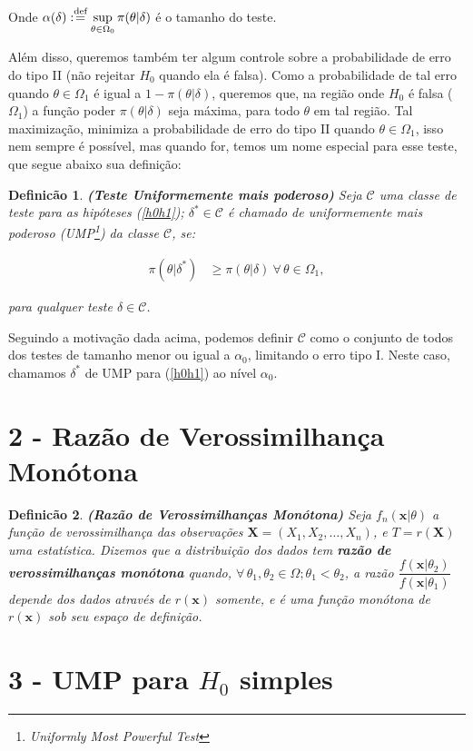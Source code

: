 \documentclass[a4paper,10pt, notitlepage]{report}
\newtheorem{defi}{Definicão}
\newcommand{\rs}{X_1, X_2, \ldots, X_n} %
\newcommand{\bX}{\boldsymbol{X}} %
\newcommand{\bx}{\boldsymbol{x}} %
\newcommand{\defn}{\stackrel{\textrm{\scriptsize def}}{=}}
\newcommand{\mysection}[2]{\setcounter{section}{#1}\addtocounter{section}{-1}\section*{#1 - #2}}
\begin{document}
	Onde $\displaystyle\alpha(\delta):\defn\sup_{\theta\in\Omega_0}\pi(\theta|\delta)$ é o tamanho do teste.
	
	
	
	Além disso, queremos também ter algum controle sobre a probabilidade de erro do tipo II (não rejeitar $H_0$ quando ela é falsa). Como a probabilidade de tal erro quando $\theta \in \Omega_1$ é igual a $1-\pi(\theta|\delta)$, queremos que, na região onde $H_0$ é falsa ($\Omega_1$) a função poder $\pi(\theta|\delta)$ seja máxima, para todo $\theta$ em tal região. Tal maximização, minimiza a probabilidade de erro do tipo II quando $\theta\in\Omega_1$, isso nem sempre é possível, mas quando for, temos um nome especial para esse teste, que segue abaixo sua definição:
	
	\begin{defi}
		\textbf{(Teste Uniformemente mais poderoso)}
		\label{ump} 
		Seja $\mathcal{C}$ uma classe de teste para as hipóteses (\ref{h0h1}); $\delta^*\in\mathcal{C}$ é chamado de uniformemente mais poderoso (UMP\footnote{Uniformly Most Powerful Test}) da classe $\mathcal{C}$, se:
		
		\begin{align*}\pi(\theta|\delta^*)&\geq\pi(\theta|\delta) ~\forall \,\theta \in \Omega_1,
		\end{align*}
		
		para qualquer teste $\delta\in\mathcal{C}$.
		
	\end{defi} 
	Seguindo a motivação dada acima, podemos definir $\mathcal{C}$ como o conjunto de todos dos testes de tamanho menor ou igual a $\alpha_0$, limitando o erro tipo I. Neste caso, chamamos $\delta^*$ de UMP para (\ref{h0h1}) ao nível $\alpha_0$.
	
	\mysection{2}{Razão de Verossimilhança Monótona}
	
	\begin{defi}
		\textbf{(Razão de Verossimilhanças Monótona)} Seja $f_n(\bx|\theta)$ a função de verossimilhança das observações $\bX = (\rs)$, e $T=r(\bX)$ uma estatística. Dizemos que a distribuição dos dados tem \textbf{razão de verossimilhanças monótona} quando, $\forall\,\theta_1,\theta_2\in\Omega; \theta_1<\theta_2$, a razão $\dfrac{f(\bx|\theta_2)}{f(\bx|\theta_1)}$ depende dos dados através de $r(\bx)$ somente, e é uma função monótona de $r(\bx)$ sob seu espaço de definição.
	\end{defi}

	\mysection{3}{UMP para $H_0$ simples}
	
\end{document}
